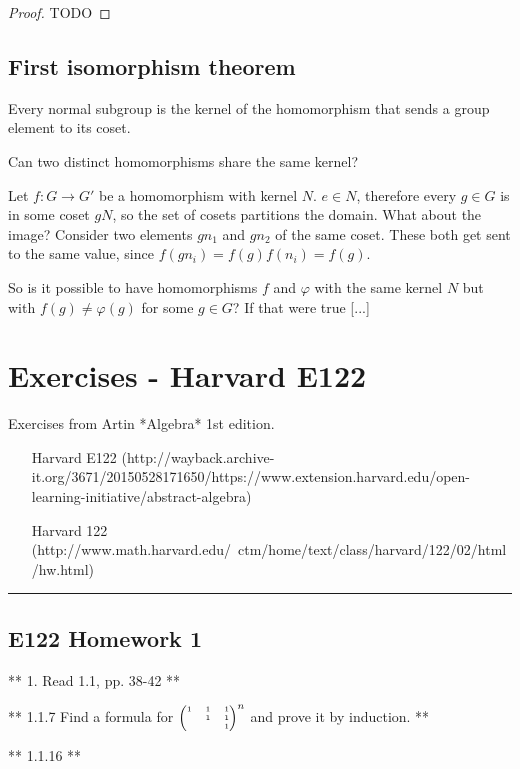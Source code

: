 \begin{proof}
  TODO
\end{proof}
\newpage
\subsection{First isomorphism theorem}


Every normal subgroup is the kernel of the homomorphism that sends a group element to its coset.

Can two distinct homomorphisms share the same kernel?

Let $f: G \rightarrow G'$ be a homomorphism with kernel $N$. $e \in N$,
therefore every $g \in G$ is in some coset $gN$, so the set of cosets
partitions the domain. What about the image? Consider two elements $gn_1$ and
$gn_2$ of the same coset. These both get sent to the same value, since
$f(gn_i) = f(g)f(n_i) = f(g)$.

So is it possible to have homomorphisms $f$ and $\varphi$ with the same kernel
$N$ but with $f(g) \neq \varphi(g)$ for some $g \in G$? If that were true [...]
\section{Exercises - Harvard E122}
Exercises from Artin *Algebra* 1st edition.

\begin{itemize}
\item [Harvard E122](http://wayback.archive-it.org/3671/20150528171650/https://www.extension.harvard.edu/open-learning-initiative/abstract-algebra)
\item [Harvard 122](http://www.math.harvard.edu/~ctm/home/text/class/harvard/122/02/html/hw.html)
\end{itemize}

\hrule

\subsection{E122 Homework 1}

** 1. Read 1.1, pp. 38-42 **

** 1.1.7 Find a formula for $\tiny{\begin{pmatrix}1 & 1 & 1\\  & 1 & 1\\  &   & 1\\ \end{pmatrix}}^n$ and prove it by induction. **

** 1.1.16 **

